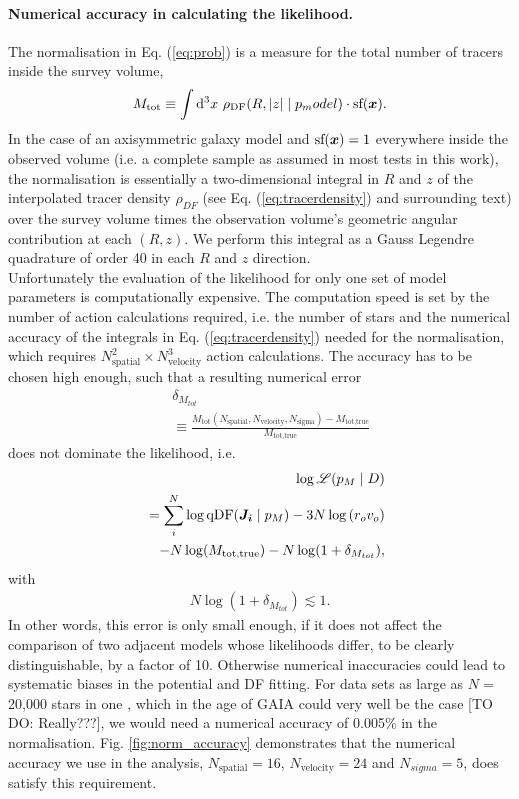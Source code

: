 \paragraph{Numerical accuracy in calculating the likelihood.} The normalisation in Eq. (\ref{eq:prob}) is a measure for the total number of tracers inside the survey volume,
\begin{equation}
M_\text{tot} \equiv \int \mathop{}\!\mathrm{d^3} x \  \rho_\text{DF}(R,|z| \mid p_model) \cdot \text{sf}(\boldsymbol{x}).\label{eq:normalisation}
\end{equation}
In the case of an axisymmetric galaxy model and $\text{sf}(\boldsymbol{x})=1$ everywhere inside the observed volume (i.e. a complete sample as assumed in most tests in this work), the normalisation is essentially a two-dimensional integral in $R$ and $z$ of the interpolated tracer density $\rho_{DF}$ (see Eq. (\ref{eq:tracerdensity}) and surrounding text) over the survey volume times the observation volume's geometric angular contribution at each $(R,z)$. We perform this integral as a Gauss Legendre quadrature of order 40 in each $R$ and $z$ direction.
\\Unfortunately the evaluation of the likelihood for only one set of model parameters is computationally expensive. The computation speed is set by the number of action calculations required, i.e. the number of stars and the numerical accuracy of the integrals in Eq. (\ref{eq:tracerdensity}) needed for the normalisation, which requires $N_\text{spatial}^2 \times N_\text{velocity}^3$ action calculations. The accuracy has to be chosen high enough, such that a resulting numerical error 
\begin{eqnarray}
&&\delta_{M_{tot}} \nonumber\\
&&\equiv \frac{M_\text{tot}(N_\text{spatial},N_\text{velocity},N_\text{sigma}) -  M_\text{tot,true} }{M_\text{tot,true}}\label{eq:relerrlikelihood}
\end{eqnarray}
does not dominate the likelihood, i.e.
\begin{eqnarray}
& &\log \mathscr{L}(p_M \mid D) \nonumber\\
&& = \sum_i^{N} \log \text{qDF}(\boldsymbol{J_i} \mid p_M) - 3N \log \left( r_o v_o\right)\nonumber\\
& & -N \log(M_\text{tot,true}) - N \log (1 + \delta_{M_{tot}}),\label{eq:loglikelihood_relerr}
\end{eqnarray}
with
\begin{eqnarray}
N \log (1 + \delta_{M_{tot}}) \lesssim 1.\nonumber
\end{eqnarray}
In other words, this error is only small enough, if it does not affect the comparison of two adjacent models whose likelihoods differ, to be clearly distinguishable, by a factor of 10. Otherwise numerical inaccuracies could lead to systematic biases in the potential and DF fitting. For data sets as large as $N =$ 20,000 stars in one \MAP, which in the age of GAIA could very well be the case [TO DO: Really???], we would need a numerical accuracy of 0.005\% in the normalisation. Fig. \ref{fig:norm_accuracy} demonstrates that the numerical accuracy we use in the analysis, $N_\text{spatial}=16$, $N_\text{velocity}=24$ and $N_{sigma}=5$, does satisfy this requirement.

